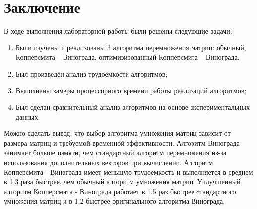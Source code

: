\chapter*{Заключение}

В ходе выполнения лабораторной работы были решены следующие задачи:

\begin{enumerate}
	\item Были изучены и реализованы 3 алгоритма перемножения матриц: обычный, Копперсмита -- Винограда, оптимизированный Копперсмита -- Винограда.
	\item Был произведён анализ трудоёмкости алгоритмов;
	\item Выполнены замеры процессорного времени работы реализаций алгоритмов;
	\item Был сделан сравнительный анализ алгоритмов на основе экспериментальных данных.
\end{enumerate}


Можно сделать вывод, что выбор алгоритма умножения матриц зависит от размера матриц и требуемой временной эффективности. Алгоритм Винограда занимает больше памяти, чем стандартный алгоритм перемножения из-за использования дополнительных векторов при вычислении. Алгоритм Копперсмита - Винограда имеет меньшую трудоемкость и выполняется в среднем в 1.3 раза быстрее, чем обычный алгоритм умножения матриц. Учлучшенный алгоритм Копперсмита - Винограда работает в 1.5 раз быстрее cтандартного умножения матриц и в 1.2 быстрее оригинального алгоритма Винограда. 